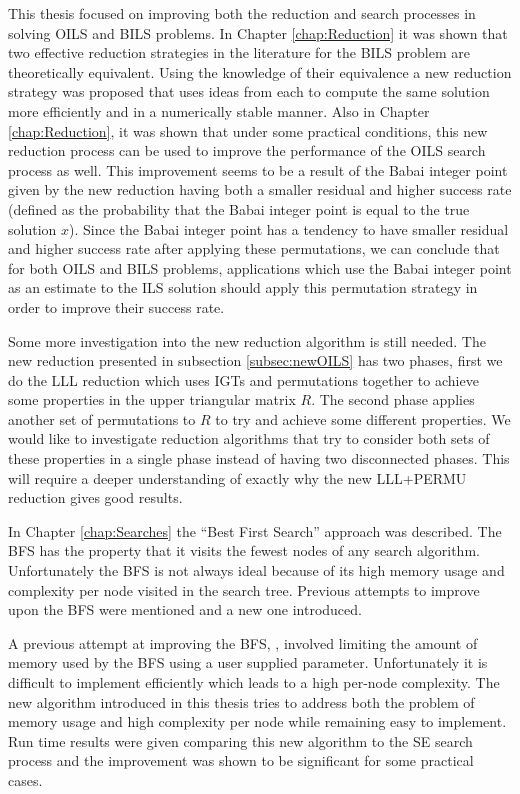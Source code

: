 \documentclass[12pt,Bold,letterpaper]{mcgilletdclass}
\begin{document}
This thesis focused on improving both the reduction and search processes in solving OILS and BILS problems. In Chapter \ref{chap:Reduction} it was shown that two effective reduction strategies in the literature for the BILS problem are theoretically equivalent. Using the knowledge of their equivalence a new reduction strategy was proposed that uses ideas from each to compute the same solution more efficiently and in a numerically stable manner. Also in Chapter \ref{chap:Reduction}, it was shown that under some practical conditions, this new reduction process can be used to improve the performance of the OILS search process as well. This improvement seems to be a result of the Babai integer point given by the new reduction having both a smaller residual and higher success rate (defined as the probability that the Babai integer point is equal to the true solution $x$). Since the Babai integer point has a tendency to have smaller residual and higher success rate after applying these permutations, we can conclude that for both OILS and BILS problems, applications which use the Babai integer point as an estimate to the ILS solution should apply this permutation strategy in order to improve their success rate.

Some more investigation into the new reduction algorithm is still needed. The new reduction presented in subsection \ref{subsec:newOILS} has two phases, first we do the LLL reduction which uses IGTs and permutations together to achieve some properties in the upper triangular matrix $R$. The second phase applies another set of permutations to $R$ to try and achieve some different properties. We would like to investigate reduction algorithms that try to consider both sets of these properties in a single phase instead of having two disconnected phases. This will require a deeper understanding of exactly why the new LLL+PERMU reduction gives good results.

In Chapter \ref{chap:Searches} the ``Best First Search'' approach was described. The BFS has the property that it visits the fewest nodes of any search algorithm. Unfortunately the BFS is not always ideal because of its high memory usage and complexity per node visited in the search tree. Previous attempts to improve upon the BFS were mentioned and a new one introduced. 

A previous attempt at improving the BFS, \cite{StuBF07}, involved limiting the amount of memory used by the BFS using a user supplied parameter. Unfortunately it is difficult to implement efficiently which leads to a high per-node complexity. The new algorithm introduced in this thesis tries to address both the problem of memory usage and high complexity per node while remaining easy to implement. Run time results were given comparing this new algorithm to the SE search process and the improvement was shown to be significant for some practical cases. 
\end{document}
